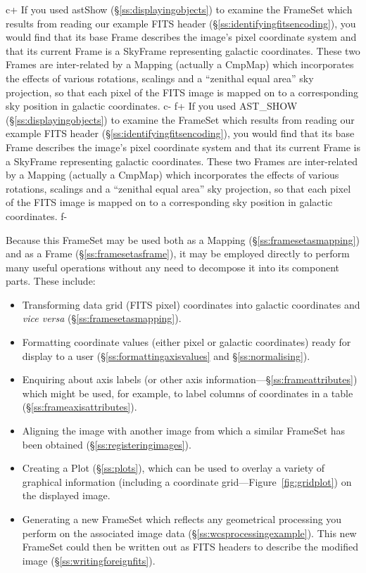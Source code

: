 \documentclass[twoside,11pt]{article}
\newcommand{\secref}[1]{\S\ref{#1}}
\newcommand{\secref}[1]{\ref{#1}}
\begin{document}
c+
If you used astShow (\secref{ss:displayingobjects}) to examine the
FrameSet which results from reading our example FITS header
(\secref{ss:identifyingfitsencoding}), you would find that its base
Frame describes the image's pixel coordinate system and that its
current Frame is a SkyFrame representing galactic coordinates. These
two Frames are inter-related by a Mapping (actually a CmpMap) which
incorporates the effects of various rotations, scalings and a
``zenithal equal area'' sky projection, so that each pixel of the FITS
image is mapped on to a corresponding sky position in galactic
coordinates.
c-
f+
If you used AST\_SHOW (\secref{ss:displayingobjects}) to examine the
FrameSet which results from reading our example FITS header
(\secref{ss:identifyingfitsencoding}), you would find that its base
Frame describes the image's pixel coordinate system and that its
current Frame is a SkyFrame representing galactic coordinates. These
two Frames are inter-related by a Mapping (actually a CmpMap) which
incorporates the effects of various rotations, scalings and a
``zenithal equal area'' sky projection, so that each pixel of the FITS
image is mapped on to a corresponding sky position in galactic
coordinates.
f-

Because this FrameSet may be used both as a Mapping
(\secref{ss:framesetasmapping}) and as a Frame
(\secref{ss:framesetasframe}), it may be employed directly to perform
many useful operations without any need to decompose it into its
component parts. These include:

\begin{itemize}
\item Transforming data grid (FITS pixel) coordinates into galactic
coordinates and {\em{vice versa}} (\secref{ss:framesetasmapping}).

\item Formatting coordinate values (either pixel or galactic
coordinates) ready for display to a user
(\secref{ss:formattingaxisvalues} and \secref{ss:normalising}).

\item Enquiring about axis labels (or other axis
information---\secref{ss:frameattributes}) which might be used, for
example, to label columns of coordinates in a table
(\secref{ss:frameaxisattributes}).

\item Aligning the image with another image from which a similar
FrameSet has been obtained (\secref{ss:registeringimages}).

\item Creating a Plot (\secref{ss:plots}), which can be used to overlay
a variety of graphical information (including a coordinate
grid---Figure~\ref{fig:gridplot}) on the displayed image.

\item Generating a new FrameSet which reflects any geometrical
processing you perform on the associated image data
(\secref{ss:wcsprocessingexample}). This new FrameSet could then be
written out as FITS headers to describe the modified image
(\secref{ss:writingforeignfits}).
\end{itemize}
\end{document}
